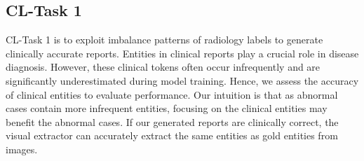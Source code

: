 \documentclass[sn-mathphys-num]{sn-jnl}%
\theoremstyle{thmstyleone}%
\theoremstyle{thmstyletwo}%
\theoremstyle{thmstylethree}%
\begin{document}
\subsection{CL-Task 1}
\label{subsec:task1}
CL-Task 1 is to exploit imbalance patterns of radiology labels to generate clinically accurate reports. 
Entities in clinical reports play a crucial role in disease diagnosis. 
However, these clinical tokens often occur infrequently and are significantly underestimated during model training. 
Hence, we assess the accuracy of clinical entities to evaluate performance.
Our intuition is that as abnormal cases contain more infrequent entities, focusing on the clinical entities may benefit the abnormal cases.
If our generated reports are clinically correct, the visual extractor can accurately extract the same entities as gold entities from images.
\end{document}
